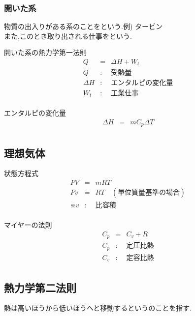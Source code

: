 \documentclass[a4paper]{jsarticle}
\begin{document}
\subsubsection{開いた系}
物質の出入りがある系のことをという.\quad 例) タービン\\
また,このとき取り出される仕事をという.
\begin{itembox}[l]{開いた系の熱力学第一法則}
    \begin{eqnarray*}
        Q&=&\Delta H+W_t\\
        Q&:&受熱量\\
        \Delta H&:&エンタルピの変化量\\
        W_t&:&工業仕事\\
    \end{eqnarray*}
\end{itembox}
\begin{itembox}[l]{エンタルピの変化量}
    \begin{eqnarray*}
        \Delta H&=&mC_p\Delta T\\
    \end{eqnarray*}
\end{itembox}
\subsection{理想気体}
\begin{itembox}[l]{状態方程式}
    \begin{eqnarray*}
        PV&=&mRT\\
        Pv&=&RT\quad (単位質量基準の場合)\\
        ※v&:&比容積\\
    \end{eqnarray*}
\end{itembox}
\begin{itembox}[l]{マイヤーの法則}
    \begin{eqnarray*}
        C_p&=&C_v+R\\
        C_p&:&定圧比熱\\
        C_v&:&定容比熱\\
    \end{eqnarray*}
\end{itembox}
\subsection{熱力学第二法則}
\begin{center}
    熱は高いほうから低いほうへと移動するというのことを指す.
\end{center}
\end{document}

